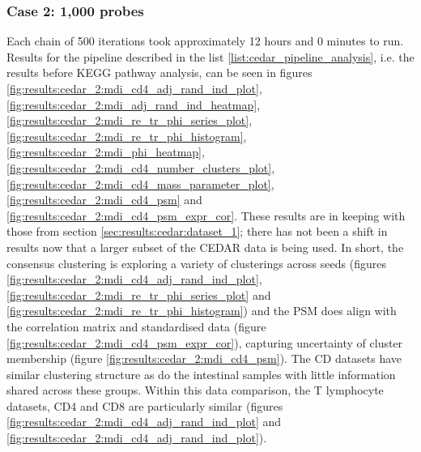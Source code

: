 \documentclass[12pt]{article} %
\begin{document}
	
%	
	
	\subsubsection{Case 2: 1,000 probes} \label{sec:results:cedar:dataset_2}
	Each chain of 500 iterations took approximately 12 hours and 0 minutes to run. Results for the pipeline described in the list \ref{list:cedar_pipeline_analysis}, i.e. the results before KEGG pathway analysis, can be seen in figures \ref{fig:results:cedar_2:mdi_cd4_adj_rand_ind_plot}, \ref{fig:results:cedar_2:mdi_adj_rand_ind_heatmap}, \ref{fig:results:cedar_2:mdi_re_tr_phi_series_plot}, \ref{fig:results:cedar_2:mdi_re_tr_phi_histogram}, \ref{fig:results:cedar_2:mdi_phi_heatmap}, \ref{fig:results:cedar_2:mdi_cd4_number_clusters_plot},  \ref{fig:results:cedar_2:mdi_cd4_mass_parameter_plot}, \ref{fig:results:cedar_2:mdi_cd4_psm} and  \ref{fig:results:cedar_2:mdi_cd4_psm_expr_cor}. These results are in keeping with those from section \ref{sec:results:cedar:dataset_1}; there has not been a shift in results now that a larger subset of the CEDAR data is being used. In short, the consensus clustering is exploring a variety of clusterings across seeds (figures \ref{fig:results:cedar_2:mdi_cd4_adj_rand_ind_plot}, \ref{fig:results:cedar_2:mdi_re_tr_phi_series_plot} and \ref{fig:results:cedar_2:mdi_re_tr_phi_histogram}) and the PSM does align with the correlation matrix and standardised data (figure \ref{fig:results:cedar_2:mdi_cd4_psm_expr_cor}), capturing uncertainty of cluster membership (figure \ref{fig:results:cedar_2:mdi_cd4_psm}). The CD datasets have similar clustering structure as do the intestinal samples with little information shared across these groups. Within this data comparison, the T lymphocyte datasets, CD4 and CD8 are particularly similar (figures \ref{fig:results:cedar_2:mdi_cd4_adj_rand_ind_plot} and \ref{fig:results:cedar_2:mdi_cd4_adj_rand_ind_plot}).
	
\end{document}
